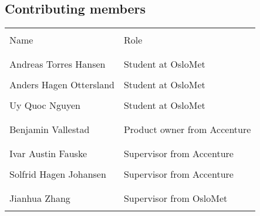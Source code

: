 \subsection{Contributing members}
\begin{center}
	\begin{tabular}{ll}
		\hline
		&\\
		Name & Role  \\
		&\\
		\hline
		& \\
		Andreas Torres Hansen & Student at OsloMet \\&\\
		Anders Hagen Ottersland & Student at OsloMet\\&\\
		Uy Quoc Nguyen & Student at OsloMet \\&\\&\\
		Benjamin Vallestad & Product owner from Accenture\\&\\&\\
		Ivar Austin Fauske  & Supervisor from Accenture \\&\\
		Solfrid Hagen Johansen & Supervisor from Accenture \\&\\&\\
		Jianhua Zhang & Supervisor from OsloMet\\&\\
		\hline
	\end{tabular}
\end{center}